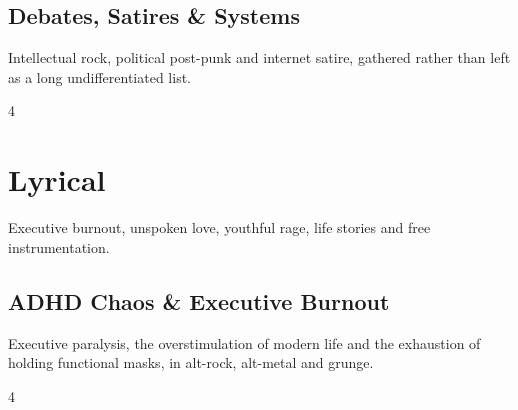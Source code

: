 \documentclass[a4paper,landscape]{memoir}
\begin{document}
\chapter{Debates, Satires \& Systems}
Intellectual rock, political post-punk and internet satire, gathered rather than left as a long undifferentiated list.
\clearpage\begin{multicols*}{4}
\end{multicols*}

\part{Lyrical}
Executive burnout, unspoken love, youthful rage, life stories and free instrumentation.

\chapter{ADHD Chaos \& Executive Burnout}
Executive paralysis, the overstimulation of modern life and the exhaustion of holding functional masks, in alt-rock, alt-metal and grunge.
\clearpage\begin{multicols*}{4}
\end{multicols*}
\end{document}
